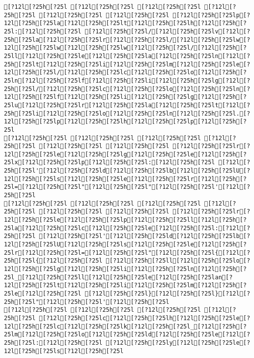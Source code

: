 \documentclass{scrartcl}
\begin{document}
\begin{Verbatim}
[?12l[?25h[?25l [?12l[?25h[?25l [?12l[?25h[?25l [?12l[?25h[?25l [?12l[?25h[?25l [?12l[?25h[?25l [?12l[?25h[?25lp[?12l[?25h[?25la[?12l[?25h[?25lt[?12l[?25h[?25lh[?12l[?25h[?25l:[?12l[?25h[?25l [?12l[?25h[?25l/[?12l[?25h[?25lv[?12l[?25h[?25la[?12l[?25h[?25lr[?12l[?25h[?25l/[?12l[?25h[?25lw[?12l[?25h[?25lw[?12l[?25h[?25lw[?12l[?25h[?25l/[?12l[?25h[?25ll[?12l[?25h[?25le[?12l[?25h[?25la[?12l[?25h[?25ln[?12l[?25h[?25lt[?12l[?25h[?25li[?12l[?25h[?25lm[?12l[?25h[?25le[?12l[?25h[?25l/[?12l[?25h[?25lc[?12l[?25h[?25lo[?12l[?25h[?25ln[?12l[?25h[?25lf[?12l[?25h[?25li[?12l[?25h[?25lg[?12l[?25h[?25l/[?12l[?25h[?25lc[?12l[?25h[?25lo[?12l[?25h[?25ln[?12l[?25h[?25lf[?12l[?25h[?25li[?12l[?25h[?25lg[?12l[?25h[?25lu[?12l[?25h[?25lr[?12l[?25h[?25la[?12l[?25h[?25lt[?12l[?25h[?25li[?12l[?25h[?25lo[?12l[?25h[?25ln[?12l[?25h[?25l.[?12l[?25h[?25lp[?12l[?25h[?25lh[?12l[?25h[?25lp[?12l[?25h[?25l
[?12l[?25h[?25l [?12l[?25h[?25l [?12l[?25h[?25l [?12l[?25h[?25l [?12l[?25h[?25l [?12l[?25h[?25l [?12l[?25h[?25lr[?12l[?25h[?25le[?12l[?25h[?25lg[?12l[?25h[?25le[?12l[?25h[?25lx[?12l[?25h[?25lp[?12l[?25h[?25l:[?12l[?25h[?25l [?12l[?25h[?25l'[?12l[?25h[?25ld[?12l[?25h[?25lb[?12l[?25h[?25lU[?12l[?25h[?25ls[?12l[?25h[?25le[?12l[?25h[?25lr[?12l[?25h[?25l=[?12l[?25h[?25l"[?12l[?25h[?25l"[?12l[?25h[?25l'[?12l[?25h[?25l
[?12l[?25h[?25l [?12l[?25h[?25l [?12l[?25h[?25l [?12l[?25h[?25l [?12l[?25h[?25l [?12l[?25h[?25l [?12l[?25h[?25lr[?12l[?25h[?25le[?12l[?25h[?25lp[?12l[?25h[?25ll[?12l[?25h[?25la[?12l[?25h[?25lc[?12l[?25h[?25le[?12l[?25h[?25l:[?12l[?25h[?25l [?12l[?25h[?25l'[?12l[?25h[?25ld[?12l[?25h[?25lb[?12l[?25h[?25lU[?12l[?25h[?25ls[?12l[?25h[?25le[?12l[?25h[?25lr[?12l[?25h[?25l=[?12l[?25h[?25l"[?12l[?25h[?25l{[?12l[?25h[?25l{[?12l[?25h[?25l [?12l[?25h[?25ll[?12l[?25h[?25lo[?12l[?25h[?25lg[?12l[?25h[?25li[?12l[?25h[?25ln[?12l[?25h[?25l_[?12l[?25h[?25ll[?12l[?25h[?25le[?12l[?25h[?25lan[?12l[?25h[?25lt[?12l[?25h[?25li[?12l[?25h[?25lm[?12l[?25h[?25le[?12l[?25h[?25l [?12l[?25h[?25l}[?12l[?25h[?25l}[?12l[?25h[?25l"[?12l[?25h[?25l'[?12l[?25h[?25l
[?12l[?25h[?25l [?12l[?25h[?25l [?12l[?25h[?25l [?12l[?25h[?25l [?12l[?25h[?25lc[?12l[?25h[?25lh[?12l[?25h[?25le[?12l[?25h[?25lc[?12l[?25h[?25lk[?12l[?25h[?25l_[?12l[?25h[?25lm[?12l[?25h[?25lo[?12l[?25h[?25ld[?12l[?25h[?25le[?12l[?25h[?25l:[?12l[?25h[?25l [?12l[?25h[?25ly[?12l[?25h[?25le[?12l[?25h[?25ls[?12l[?25h[?25l

\end{Verbatim}
\end{document}
